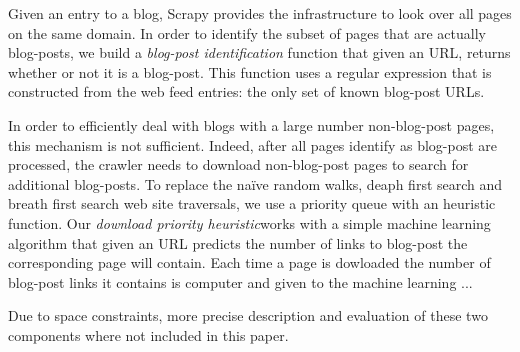 Given an entry to a blog, Scrapy provides the infrastructure to look over all pages on the same domain. In order to identify the subset of pages that are actually blog-posts, we build a \emph{blog-post identification} function that given an URL, returns whether or not it is a blog-post. This function uses a regular expression that is constructed from the web feed entries: the only set of known blog-post URLs.

In order to efficiently deal with blogs with a large number non-blog-post pages, this mechanism is not sufficient. Indeed, after all pages identify as blog-post are processed, the crawler needs to download non-blog-post pages to search for additional blog-posts. To replace the naïve random walks, deaph first search and breath first search web site traversals, we use a priority queue with an heuristic function. Our \emph{download priority heuristic}works with a simple machine learning algorithm that given an URL predicts the number of links to blog-post the corresponding page will contain. Each time a page is dowloaded the number of blog-post links it contains is computer and given to the machine learning ...

Due to space constraints, more precise description and evaluation of these two components where not included in this paper.


